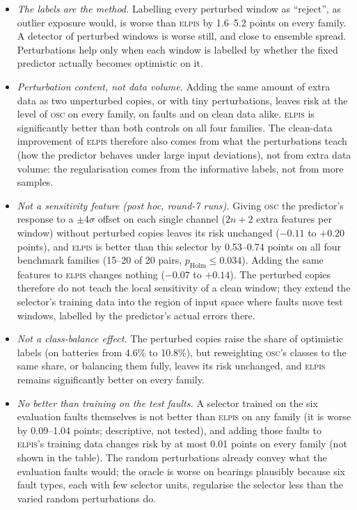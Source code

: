 \documentclass{esannV2}
\newcommand{\OSC}{\textsc{osc}}
\newcommand{\RPT}{\textsc{elpis}}
\begin{document}
\begin{itemize}
\item \emph{The labels are the method.} Labelling every perturbed window as ``reject'', as outlier exposure would, is worse than \RPT{} by 1.6--5.2 points on every family. A detector of perturbed windows is worse still, and close to ensemble spread. Perturbations help only when each window is labelled by whether the fixed predictor actually becomes optimistic on it.
\item \emph{Perturbation content, not data volume.} Adding the same amount of extra data as two unperturbed copies, or with tiny perturbations, leaves risk at the level of \OSC{} on every family, on faults and on clean data alike. \RPT{} is significantly better than both controls on all four families. The clean-data improvement of \RPT{} therefore also comes from what the perturbations teach (how the predictor behaves under large input deviations), not from extra data volume: the regularisation comes from the informative labels, not from more samples.
\item \emph{Not a sensitivity feature (post hoc, round-7 runs).} Giving \OSC{} the predictor's response to a $\pm4\sigma$ offset on each single channel ($2n+2$ extra features per window) without perturbed copies leaves its risk unchanged ($-0.11$ to $+0.20$ points), and \RPT{} is better than this selector by 0.53--0.74 points on all four benchmark families (15--20 of 20 pairs, $p_{\text{Holm}}\le0.034$). Adding the same features to \RPT{} changes nothing ($-0.07$ to $+0.14$). The perturbed copies therefore do not teach the local sensitivity of a clean window; they extend the selector's training data into the region of input space where faults move test windows, labelled by the predictor's actual errors there.
\item \emph{Not a class-balance effect.} The perturbed copies raise the share of optimistic labels (on batteries from 4.6\% to 10.8\%), but reweighting \OSC's classes to the same share, or balancing them fully, leaves its risk unchanged, and \RPT{} remains significantly better on every family.
\item \emph{No better than training on the test faults.} A selector trained on the six evaluation faults themselves is not better than \RPT{} on any family (it is worse by 0.09--1.04 points; descriptive, not tested), and adding those faults to \RPT's training data changes risk by at most 0.01 points on every family (not shown in the table). The random perturbations already convey what the evaluation faults would; the oracle is worse on bearings plausibly because six fault types, each with few selector units, regularise the selector less than the varied random perturbations do.

\end{itemize}
\end{document}
